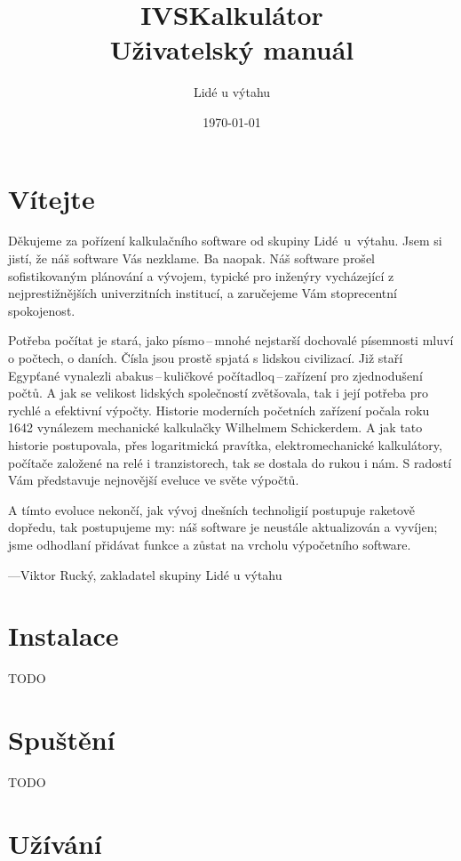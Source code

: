 \documentclass[a5paper]{article}
\title{IVSKalkulátor\\Uživatelský manuál}
\author{Lidé u výtahu}
\date{\today}
\begin{document}
    \setlength{\parindent}{0em}
    \setlength{\parskip}{1em}
    \maketitle
    
    \newpage

    \section*{Vítejte}
    Děkujeme za pořízení kalkulačního software od skupiny Lidé~u~výtahu. Jsem si jistí, že náš software Vás nezklame. Ba naopak. Náš software prošel sofistikovaným plánování a vývojem, typické pro inženýry vycházející z nejprestižnějších univerzitních institucí, a zaručejeme Vám stoprecentní spokojenost.

    Potřeba počítat je stará, jako písmo\,--\,mnohé nejstarší dochovalé písemnosti mluví o počtech, o daních. Čísla jsou prostě spjatá s lidskou civilizací. Již staří Egypťané vynalezli abakus\,--\,kuličkové počítadloq\,--\,zařízení pro zjednodušení počtů. A jak se velikost lidských společností zvětšovala, tak i její potřeba pro rychlé a efektivní výpočty. Historie moderních početních zařízení počala roku 1642 vynálezem mechanické kalkulačky Wilhelmem Schickerdem. A jak tato historie postupovala, přes logaritmická pravítka, elektromechanické kalkulátory, počítače založené na relé i tranzistorech, tak se dostala do rukou i nám. S radostí Vám představuje nejnovější eveluce ve světe výpočtů.

    A tímto evoluce nekončí, jak vývoj dnešních technoligií postupuje raketově dopředu, tak postupujeme my: náš software je neustále aktualizován a vyvíjen; jsme odhodlaní přidávat funkce a zůstat na vrcholu výpočetního software.
    
    ---Viktor Rucký, zakladatel skupiny Lidé u výtahu
    \newpage
    \section{Instalace}
    TODO
    \section{Spuštění}
    TODO
    \section{Užívání}
\end{document}
